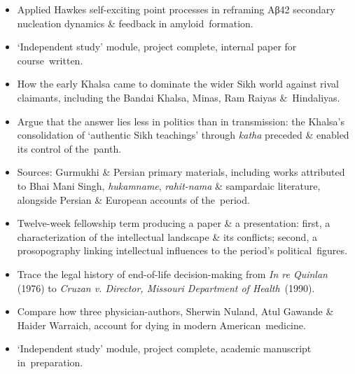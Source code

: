 \begin{itemize}
  \item Applied Hawkes self-exciting point processes in reframing Aβ42 secondary nucleation dynamics \& feedback in \cvkeep{}amyloid~\cvlast{}formation.\cvkeepend{}
  \item `Independent study' module, project complete, internal paper for \cvkeep{}course~\cvlast{}written.\cvkeepend{}
\end{itemize}
\begin{itemize}
  \item How the early Khalsa came to dominate the wider Sikh world against rival claimants, including the Bandai Khalsa, Minas, Ram Raiyas \cvkeep{}\&~\cvlast{}Hindaliyas.\cvkeepend{}
  \item Argue that the answer lies less in politics than in transmission: the Khalsa's consolidation of `authentic Sikh teachings' through \textit{katha} preceded \& enabled its control of \cvkeep{}the~\cvlast{}panth.\cvkeepend{}
  \item Sources: Gurmukhi \& Persian primary materials, including works attributed to Bhai Mani Singh, \textit{hukamname}, \textit{rahit-nama} \& sampardaic literature, alongside Persian \& European accounts of \cvkeep{}the~\cvlast{}period.\cvkeepend{}
  \item Twelve-week fellowship term producing a paper \& a presentation: first, a characterization of the intellectual landscape \& its conflicts; second, a prosopography linking intellectual influences to the period's \cvkeep{}political~\cvlast{}figures.\cvkeepend{}
\end{itemize}
\begin{itemize}
  \item Trace the legal history of end-of-life decision-making from \textit{In re Quinlan} (1976) to \textit{Cruzan v. Director, Missouri Department of \cvkeep{}Health}~\cvlast{}(1990).\cvkeepend{}
  \item Compare how three physician-authors, Sherwin Nuland, Atul Gawande \& Haider Warraich, account for dying in modern \cvkeep{}American~\cvlast{}medicine.\cvkeepend{}
  \item `Independent study' module, project complete, academic manuscript \cvkeep{}in~\cvlast{}preparation.\cvkeepend{}
\end{itemize}

